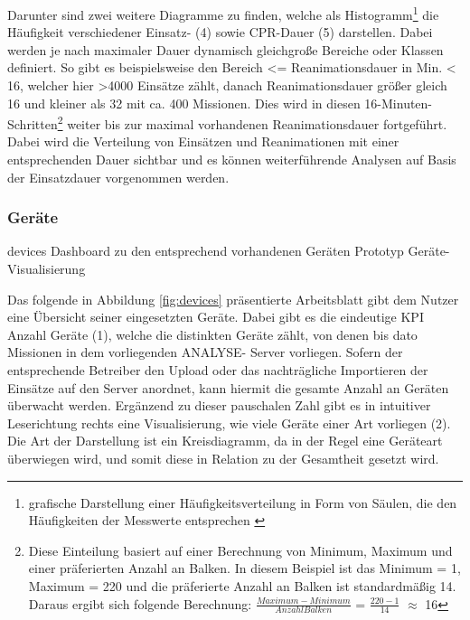 Darunter sind zwei weitere Diagramme zu finden, welche als Histogramm\footnote{\glqq grafische Darstellung einer Häufigkeitsverteilung in Form von Säulen, die den Häufigkeiten der Messwerte entsprechen\grqq{} \cite{Dudenredaktion.2015}} die Häufigkeit verschiedener Einsatz- (4) sowie \gls{CPR}-Dauer (5) darstellen.
Dabei werden je nach maximaler Dauer dynamisch gleichgroße Bereiche oder \glqq Klassen\grqq{} definiert.
So gibt es beispielsweise den Bereich  <= Reanimationsdauer in Min. < 16\grqq{}, welcher hier >4000 Einsätze zählt, danach Reanimationsdauer größer gleich 16 und kleiner als 32 mit ca. 400 Missionen.
Dies wird in diesen 16-Minuten-Schritten\footnote{Diese Einteilung basiert auf einer Berechnung von Minimum, Maximum und einer präferierten Anzahl an Balken.
In diesem Beispiel ist das Minimum = 1, Maximum = 220 und die präferierte Anzahl an Balken ist standardmäßig 14.
Daraus ergibt sich folgende Berechnung: $\frac{Maximum-Minimum}{Anzahl Balken}$ = $\frac{220-1}{14}$ $\approx$ 16}
 weiter bis zur maximal vorhandenen Reanimationsdauer fortgeführt.
Dabei wird die Verteilung von Einsätzen und Reanimationen mit einer entsprechenden Dauer sichtbar und es können weiterführende Analysen auf Basis der Einsatzdauer vorgenommen werden.

\subsubsection{Geräte}
\label{subsub:geräte}
\bildbreit
{devices}
{Dashboard zu den entsprechend vorhandenen Geräten}
{Prototyp Geräte-Visualisierung}

Das folgende in Abbildung \ref{fig:devices} präsentierte Arbeitsblatt gibt dem Nutzer eine Übersicht seiner eingesetzten Geräte.
Dabei gibt es die eindeutige \gls{KPI} \glqq Anzahl Geräte\grqq{} (1), welche die distinkten Geräte zählt, von denen bis dato Missionen in dem vorliegenden \gls{ANALYSE}- Server vorliegen.
Sofern der entsprechende Betreiber den Upload oder das nachträgliche Importieren der Einsätze auf den Server anordnet, kann hiermit die gesamte Anzahl an Geräten überwacht werden. %
Ergänzend zu dieser pauschalen Zahl gibt es in intuitiver Leserichtung rechts eine Visualisierung, wie viele Geräte einer Art vorliegen (2).
Die Art der Darstellung ist ein Kreisdiagramm, da in der Regel eine Geräteart überwiegen wird, und somit diese in Relation zu der Gesamtheit gesetzt wird.

